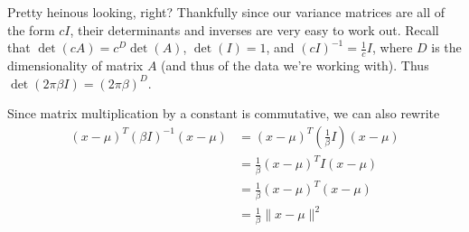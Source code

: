 \documentclass[11pt,dvipsnames]{article}
\begin{document}
Pretty heinous looking, right? Thankfully since our variance matrices are all of the form $c I$, their determinants and inverses are very easy to work out.
Recall that $\det(c A) = c^D \det(A)$, $\det(I) = 1$, and $\left(c I\right)^{-1} = \frac{1}{c}I$, where $D$ is the dimensionality of matrix $A$ (and thus of the data we're working with). Thus $\det(2 \pi \beta I) = (2 \pi \beta)^D$.

Since matrix multiplication by a constant is commutative, we can also rewrite
\begin {equation*}
\begin{split}
(x - \mu)^T (\beta I)^{-1} (x - \mu) &= (x - \mu)^T \left(\frac{1}{\beta} I \right) (x - \mu) \\
&= \frac{1}{\beta} (x - \mu)^T I (x - \mu) \\
&= \frac{1}{\beta} (x - \mu)^T (x - \mu) \\
&= \frac{1}{\beta} \lVert x - \mu \rVert^2 \\
\end{split}
\end{equation*}
\end{document}
